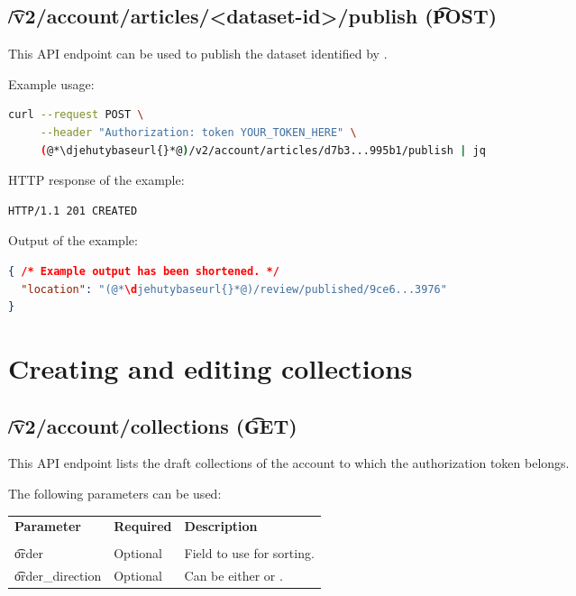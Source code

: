 \subsection{\t{/v2/account/articles/<dataset-id>/publish} (\t{POST})}

  This API endpoint can be used to publish the dataset identified by
  .


  Example usage:
\begin{lstlisting}[language=bash]
curl --request POST \
     --header "Authorization: token YOUR_TOKEN_HERE" \
     (@*\djehutybaseurl{}*@)/v2/account/articles/d7b3...995b1/publish | jq
\end{lstlisting}

  HTTP response of the example:
\begin{lstlisting}
HTTP/1.1 201 CREATED
\end{lstlisting}

  Output of the example:
\begin{lstlisting}[language=JSON]
{ /* Example output has been shortened. */
  "location": "(@*\djehutybaseurl{}*@)/review/published/9ce6...3976"
}
\end{lstlisting}

\section{Creating and editing collections}

\subsection{\t{/v2/account/collections} (\t{GET})}

  This API endpoint lists the draft collections of the account to which the
  authorization token belongs.

  The following parameters can be used:

\begin{tabularx}{\textwidth}{*{2}{!{\VRule[-1pt]}l}!{\VRule[-1pt]}X}
  \headrow
  \textbf{Parameter}   & \textbf{Required} & \textbf{Description}\\
  \pagingOptions[dataset]\\
  \t{order}            & Optional & Field to use for sorting.\\
  \t{order\_direction} & Optional & Can be either  or .
\end{tabularx}

